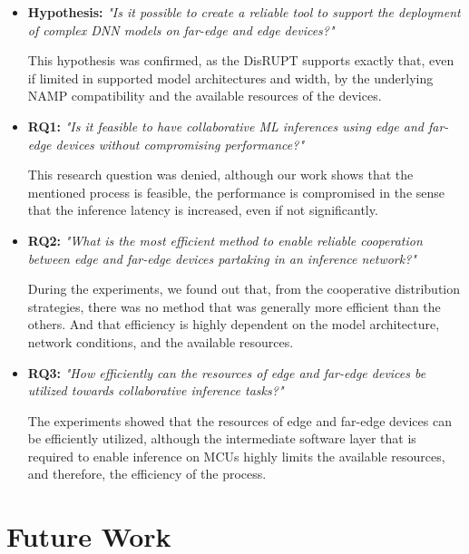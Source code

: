 \begin{itemize}
    \item \textbf{Hypothesis: } \textit{"Is it possible to create a reliable tool to 
        support the deployment of complex \ac{DNN} models on far-edge and edge devices?"}
        
        \subitem This hypothesis was confirmed, as the \ac{DisRUPT} supports exactly that,
        even if limited in supported model architectures and width, by the underlying 
        NAMP compatibility and the available resources of the devices.  
    
    \item \textbf{RQ1: } \textit{"Is it feasible to have collaborative ML inferences 
        using edge and far-edge devices without compromising performance?"}

        \subitem This research question was denied, although our work
        shows that the mentioned process is feasible, the performance is compromised
        in the sense that the inference latency is increased, even if not significantly. 

    \item \textbf{RQ2: } \textit{"What is the most efficient method to enable reliable 
        cooperation between edge and far-edge devices partaking in an inference 
        network?"}

        \subitem During the experiments, we found out that, from the cooperative
        distribution strategies, there was no method that was generally more efficient
        than the others. And that efficiency is highly dependent on the model 
        architecture, network conditions, and the available resources. 

    \item \textbf{RQ3: } \textit{"How efficiently can the resources of edge and 
        far-edge devices be utilized towards collaborative inference tasks?"}

        \subitem The experiments showed that the resources of edge and far-edge
        devices can be efficiently utilized, although the intermediate software layer
        that is required to enable inference on \acp{MCU} highly limits the available
        resources, and therefore, the efficiency of the process.
        
\end{itemize}


\section{Future Work} \label{sec:se62}

